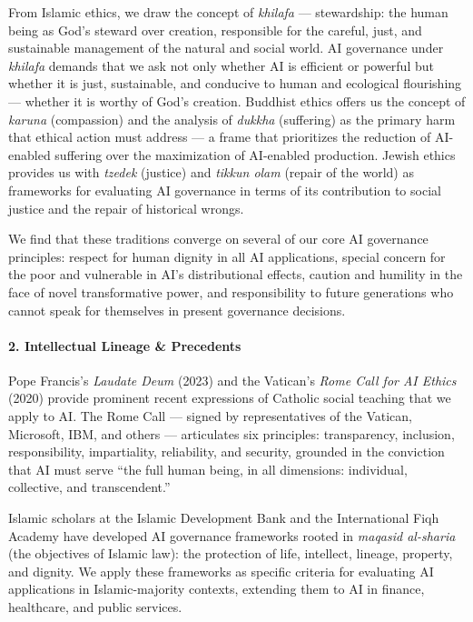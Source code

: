 From Islamic ethics, we draw the concept of \emph{khilafa} ---
stewardship: the human being as God's steward over creation, responsible
for the careful, just, and sustainable management of the natural and
social world. AI governance under \emph{khilafa} demands that we ask not
only whether AI is efficient or powerful but whether it is just,
sustainable, and conducive to human and ecological flourishing ---
whether it is worthy of God's creation. Buddhist ethics offers us the
concept of \emph{karuna} (compassion) and the analysis of \emph{dukkha}
(suffering) as the primary harm that ethical action must address --- a
frame that prioritizes the reduction of AI-enabled suffering over the
maximization of AI-enabled production. Jewish ethics provides us with
\emph{tzedek} (justice) and \emph{tikkun olam} (repair of the world) as
frameworks for evaluating AI governance in terms of its contribution to
social justice and the repair of historical wrongs.

We find that these traditions converge on several of our core AI
governance principles: respect for human dignity in all AI applications,
special concern for the poor and vulnerable in AI's distributional
effects, caution and humility in the face of novel transformative power,
and responsibility to future generations who cannot speak for themselves
in present governance decisions.

\paragraph{2. Intellectual Lineage \&
Precedents}\label{intellectual-lineage-precedents-35}

Pope Francis's \emph{Laudate Deum} (2023) and the Vatican's \emph{Rome
Call for AI Ethics} (2020) provide prominent recent expressions of
Catholic social teaching that we apply to AI. The Rome Call --- signed
by representatives of the Vatican, Microsoft, IBM, and others ---
articulates six principles: transparency, inclusion, responsibility,
impartiality, reliability, and security, grounded in the conviction that
AI must serve ``the full human being, in all dimensions: individual,
collective, and transcendent.''

Islamic scholars at the Islamic Development Bank and the International
Fiqh Academy have developed AI governance frameworks rooted in
\emph{maqasid al-sharia} (the objectives of Islamic law): the protection
of life, intellect, lineage, property, and dignity. We apply these
frameworks as specific criteria for evaluating AI applications in
Islamic-majority contexts, extending them to AI in finance, healthcare,
and public services.

